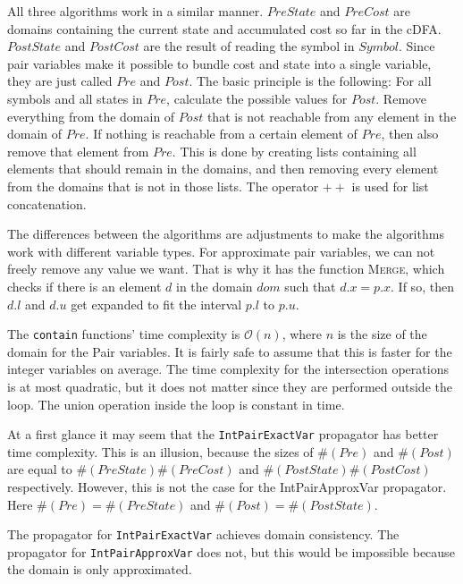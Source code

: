 \documentclass[a4paper,11pt]{article}
\begin{document}
All three algorithms work in a similar manner. $\mathit{PreState}$ and $\mathit{PreCost}$ are domains containing the current state and accumulated cost so far in the cDFA. $\mathit{PostState}$ and $\mathit{PostCost}$ are the result of reading the symbol in $\mathit{Symbol}$. Since pair variables make it possible to bundle cost and state into a single variable, they are just called $\mathit{Pre}$ and $\mathit{Post}$. The basic principle is the following: For all symbols and all states in $\mathit{Pre}$, calculate the possible values for $\mathit{Post}$. Remove everything from the domain of $\mathit{Post}$ that is not reachable from any element in the domain of $\mathit{Pre}$. If nothing is reachable from a certain element of $\mathit{Pre}$, then also remove that element from $\mathit{Pre}$. This is done by creating lists containing all elements that should remain in the domains, and then removing every element from the domains that is not in those lists. The operator $++$ is used for list concatenation.



The differences between the algorithms are adjustments to make the algorithms work with different variable types. For approximate pair variables, we can not freely remove any value we want. That is why it has the function \textsc{Merge}, which checks if there is an element $d$ in the domain $\mathit{dom}$ such that $d.x=p.x$. If so, then $d.l$ and $d.u$ get expanded to fit the interval $p.l$ to $p.u$. 

The \texttt{contain} functions' time complexity is $\mathcal{O}(n)$, where $n$ is the size of the domain for the Pair variables. It is fairly safe to assume that this is faster for the integer variables on average. The time complexity for the intersection operations is at most quadratic, but it does not matter since they are performed outside the loop. The union operation inside the loop is constant in time.

At a first glance it may seem that the \texttt{IntPairExactVar} propagator has better time complexity. This is an illusion, because the sizes of $\#(\mathit{Pre})$ and $\#(\mathit{Post})$ are equal to \linebreak
$\#(\mathit{PreState}) 
\#(\mathit{PreCost})$ and 
$\#(\mathit{PostState})\#({PostCost})$ respectively. However, this is not the case for the IntPairApproxVar propagator. Here $\#(\mathit{Pre})=\#(\mathit{PreState})$ and $\#(\mathit{Post})=\#(\mathit{PostState})$. 

The propagator for \texttt{IntPairExactVar} achieves domain consistency. The propagator for \texttt{IntPairApproxVar} does not, but this would be impossible because the domain is only approximated.
\end{document}
